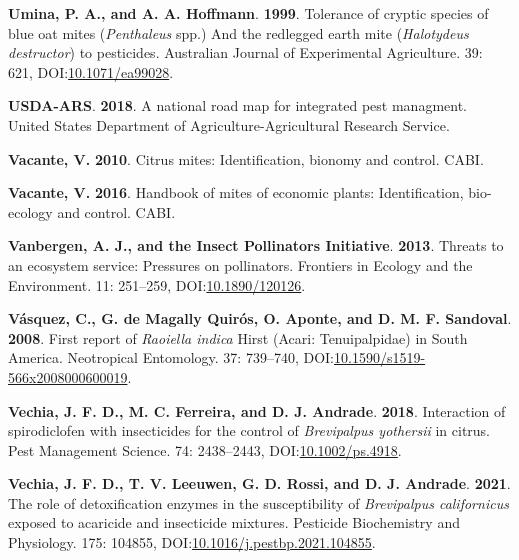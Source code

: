 \documentclass[12pt,final,CPage]{ufthesis}
\newlength{\cslhangindent}
\newenvironment{CSLReferences}[2] %
{%
	\setlength{\parindent}{0pt}
	\ifodd #1 \everypar{\setlength{\hangindent}{\cslhangindent}}\ignorespaces\fi
	\ifnum #2 > 0
	\setlength{\parskip}{#2\baselineskip}
	\fi
}%
{}
\begin{document}
{\begin{CSLReferences}{1}{0}
  \leavevmode{}%
  \textbf{Umina, P. A., and A. A. Hoffmann}. \textbf{1999}. Tolerance of cryptic species of blue oat mites ({\emph{Penthaleus}} spp.) And the redlegged earth mite ({\emph{Halotydeus destructor}}) to pesticides. Australian Journal of Experimental Agriculture. 39: 621, DOI:\href{https://doi.org/10.1071/ea99028}{10.1071/ea99028}.

  \leavevmode{}%
  \textbf{USDA-ARS}. \textbf{2018}. A national road map for integrated pest managment. {United States} Department of Agriculture-Agricultural Research Service.

  \leavevmode{}%
  \textbf{Vacante, V.} \textbf{2010}. Citrus mites: Identification, bionomy and control. CABI.

  \leavevmode{}%
  \textbf{Vacante, V.} \textbf{2016}. Handbook of mites of economic plants: Identification, bio-ecology and control. CABI.

  \leavevmode{}%
  \textbf{Vanbergen, A. J., and the Insect Pollinators Initiative}. \textbf{2013}. Threats to an ecosystem service: Pressures on pollinators. Frontiers in Ecology and the Environment. 11: 251--259, DOI:\href{https://doi.org/10.1890/120126}{10.1890/120126}.

  \leavevmode{}%
  \textbf{Vásquez, C., G. de Magally Quirós, O. Aponte, and D. M. F. Sandoval}. \textbf{2008}. First report of {\emph{Raoiella indica}} {Hirst} ({Acari}: {Tenuipalpidae}) in {South} {America}. Neotropical Entomology. 37: 739--740, DOI:\href{https://doi.org/10.1590/s1519-566x2008000600019}{10.1590/s1519-566x2008000600019}.

  \leavevmode{}%
  \textbf{Vechia, J. F. D., M. C. Ferreira, and D. J. Andrade}. \textbf{2018}. Interaction of spirodiclofen with insecticides for the control of {\emph{Brevipalpus yothersii}} in citrus. Pest Management Science. 74: 2438--2443, DOI:\href{https://doi.org/10.1002/ps.4918}{10.1002/ps.4918}.

  \leavevmode{}%
  \textbf{Vechia, J. F. D., T. V. Leeuwen, G. D. Rossi, and D. J. Andrade}. \textbf{2021}. The role of detoxification enzymes in the susceptibility of {\emph{Brevipalpus californicus}} exposed to acaricide and insecticide mixtures. Pesticide Biochemistry and Physiology. 175: 104855, DOI:\href{https://doi.org/10.1016/j.pestbp.2021.104855}{10.1016/j.pestbp.2021.104855}.


\end{CSLReferences}}
\end{document}
